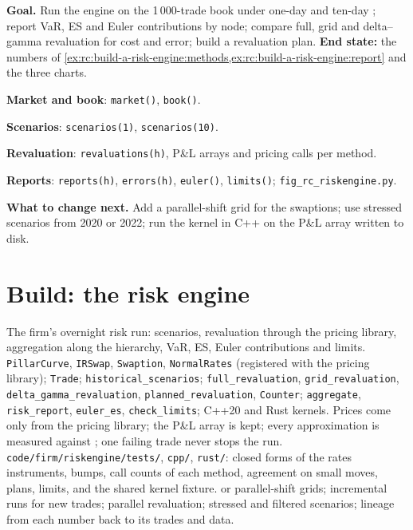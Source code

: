 \begin{tutorial}
\textbf{Goal.} Run the engine on the 1\,000-trade book under one-day and ten-day ; report
VaR, ES and Euler contributions by node; compare full, grid and delta--gamma revaluation for cost and
error; build a revaluation plan. \textbf{End state:} the numbers of
\cref{ex:rc:build-a-risk-engine:methods,ex:rc:build-a-risk-engine:report} and the three charts.
\begin{tutsteps}
\item \textbf{Market and book}: \texttt{market()}, \texttt{book()}.
\item \textbf{Scenarios}: \texttt{scenarios(1)}, \texttt{scenarios(10)}.
\item \textbf{Revaluation}: \texttt{revaluations(h)}, P\&L arrays and pricing calls per method.
\item \textbf{Reports}: \texttt{reports(h)}, \texttt{errors(h)}, \texttt{euler()}, \texttt{limits()};
\texttt{fig\_rc\_riskengine.py}.
\end{tutsteps}
\textbf{What to change next.} Add a parallel-shift grid for the swaptions; use stressed scenarios from
2020 or 2022; run the kernel in C++ on the P\&L array written to disk.
\end{tutorial}

\section{Build: the risk engine}\label{bld:rc:build-a-risk-engine:riskengine}

\begin{build}
 The firm's overnight risk run: scenarios, revaluation through the pricing library,
aggregation along the hierarchy, VaR, ES, Euler contributions and limits.
 \texttt{PillarCurve}, \texttt{IRSwap}, \texttt{Swaption}, \texttt{NormalRates}
(registered with the pricing library); \texttt{Trade}; \texttt{historical\_scenarios};
\texttt{full\_revaluation}, \texttt{grid\_revaluation}, \texttt{delta\_gamma\_revaluation},
\texttt{planned\_revaluation}, \texttt{Counter}; \texttt{aggregate}, \texttt{risk\_report},
\texttt{euler\_es}, \texttt{check\_limits}; C++20 and Rust kernels.
 Prices come only from the pricing library; the P\&L array is kept; every approximation is
measured against ; one failing trade never stops the run.
 \texttt{code/firm/riskengine/tests/}, \texttt{cpp/}, \texttt{rust/}: closed forms of the
rates instruments,  bumps, call counts of each method, agreement on small moves, plans, limits, and the
shared kernel fixture.
  or parallel-shift grids; incremental runs for new trades; parallel revaluation;
stressed and filtered scenarios; lineage from each number back to its trades and data.
\end{build}

